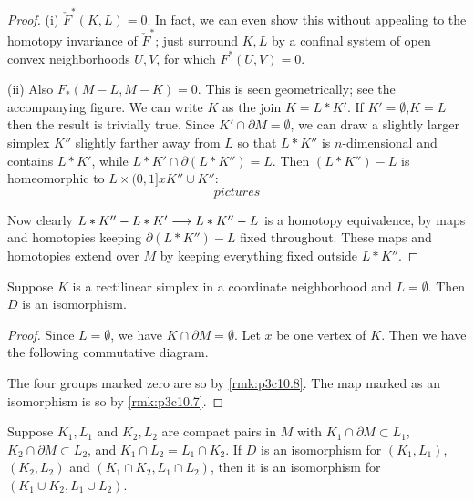 \documentclass[../main]{subfiles}
\begin{document}
\begin{proof}
(i) $\check{F}^*(K,L) = 0$. In fact, we can even show this without appealing to the homotopy invariance of $\check{F}^*$; just surround $K,L$ by a confinal system of open convex neighborhoods $U,V$, for which $F^*(U,V) = 0$.

(ii) Also $F_*(M-L,M-K) = 0$. This is seen geometrically; see the accompanying figure. We can write $K$ as the join $K = L*K'$. If $K'=\emptyset$,$K=L$ then the result is trivially true. Since $K' \cap \partial M = \emptyset$, we can draw a slightly larger simplex $K''$ slightly farther away from $L$ so that $L*K''$ is $n$-dimensional and contains $L * K'$, while $L*K' \cap \partial(L*K'') = L$. Then $(L*K'')-L$ is homeomorphic to $L \times (0,1] x K'' \cup K''$:
\[pictures\]

Now clearly $L*K'' - L*K' \longrightarrow L*K'' - L$ is a homotopy equivalence, by maps and homotopies keeping $\partial(L* K'') - L$ fixed throughout. These maps and homotopies extend over $M$ by keeping everything fixed outside $L*K''$. 
\end{proof}
\begin{remark}\label{rmk:p3c10.9}
Suppose $K$ is a rectilinear simplex in a coordinate neighborhood and $L = \emptyset$. Then $D$ is an isomorphism.
\end{remark}
\begin{proof}
Since $L = \emptyset$, we have $K \cap \partial M = \emptyset$. Let $x$ be one vertex of $K$. Then we have the following commutative diagram.

The four groups marked zero are so by \ref{rmk:p3c10.8}. The map marked as an isomorphism is so by \ref{rmk:p3c10.7}.
\end{proof}
\begin{remark}\label{rmk:p3c10.10}
Suppose $K_1,L_1$ and $K_2,L_2$ are compact pairs in $M$ with $K_1 \cap \partial M \subset L_1$, $K_2 \cap \partial M \subset L_2$, and $K_1 \cap L_2 = L_1 \cap K_2$. If $D$ is an isomorphism for $(K_1,L_1)$, $(K_2,L_2)$ and $(K_1\cap K_2,L_1 \cap L_2)$, then it is an isomorphism for $(K_1 \cup K_2, L_1 \cup L_2)$.
\end{remark}
\end{document}
